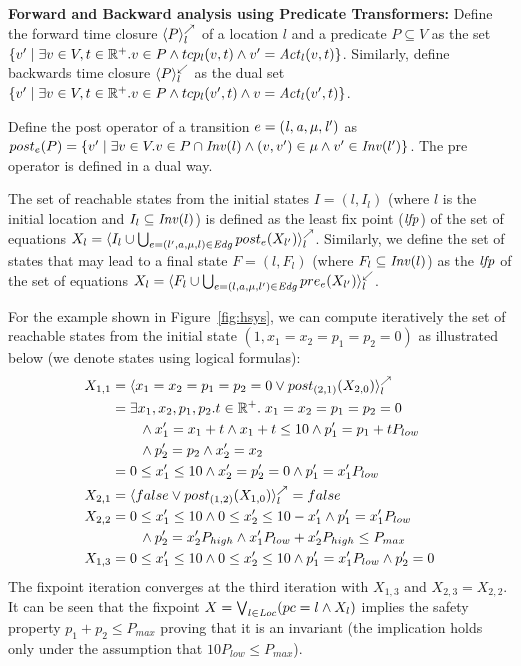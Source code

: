 \textbf{Forward and Backward analysis using Predicate Transformers:}
Define the forward time closure $\langle P \rangle^{\nearrow}_{l}$ of a location $l$ and a predicate $P \subseteq V$ as the set
$\{ v' \; | \; \exists v \in V,t \in \mathbb{R}^+. v \in P \wedge tcp_l(v,t) \wedge v' = \mathit{Act}_l(v,t) \}$.
Similarly, define backwards time closure $\langle P \rangle^{\swarrow}_{l}$ as the dual set 
$\{ v' \; | \; \exists v \in V,t \in \mathbb{R}^+. v \in P \wedge tcp_l(v',t) \wedge v = \mathit{Act}_l(v',t) \}$.

Define the post operator of a transition $e = \mathit{(l,a,\mu,l')}$ as 
$post_e(P) = \{ v' \; | \; \exists v \in V. v \in P \cap \mathit{Inv}(l) \wedge (v,v') \in \mu \wedge v' \in \mathit{Inv}(l') \}$.
The pre operator is defined in a dual way.

The set of reachable states from the initial states $I = (l,I_l)$ (where $l$ is the initial location
and $I_l \subseteq \mathit{Inv}(l)$) 
is defined as the least fix point ($\mathit{lfp}$) of the set of equations 
$X_l = \langle I_l \cup \bigcup_{e=(l',a,\mu,l) \in \mathit{Edg}} post_e(X_{l'}) \rangle^{\nearrow}_{l}$.
Similarly, we define the set of states that may lead to a final state $F = (l,F_l)$ (where $F_l \subseteq \mathit{Inv}(l)$) 
as the $\mathit{lfp}$ of the set of equations $X_l = \langle F_l \cup \bigcup_{e=(l,a,\mu,l') \in \mathit{Edg}} pre_e(X_{l'}) \rangle^{\swarrow}_{l}$.

For the example shown in Figure~\ref{fig:hsys}, we can compute iteratively the set of reachable states from 
the initial state $(1,x_1=x_2=p_1=p_2=0)$ as illustrated below (we denote states using logical formulas):
%
\begin{align*}
X_{1,1} & = \langle x_1=x_2=p_1=p_2=0 \vee post_{(2,1)}(X_{2,0}) \rangle^{\nearrow}_{l} \\
		& = \exists x_1,x_2,p_1,p_2. t \in \mathbb{R}^+. \; x_1=x_2=p_1=p_2=0   \\
		& \qquad \wedge x_1' = x_1 + t \wedge x_1 + t \le 10 \wedge p_1' = p_1 + t P_{low} \\ 
		& \qquad \wedge p_2' = p_2 \wedge x_2' = x_2\\
		& = 0 \le x_1' \le 10 \wedge x_2' = p_2' = 0 \wedge p_1' = x_1' P_{low} \\
X_{2,1} &= \langle false \vee post_{(1,2)}(X_{1,0}) \rangle^{\nearrow}_{l} = false  \\
X_{2,2} & = 0 \le x_1' \le 10 \wedge 0 \le x_2' \le 10 - x_1' \wedge p_1' = x_1'P_{low}  \\
		& \qquad \wedge p_2' = x_2' P_{high} \wedge x_1'P_{low} + x_2'P_{high} \le P_{max} \\
X_{1,3} & = 0 \le x_1' \le 10 \wedge 0 \le x_2' \le 10 \wedge p_1' = x_1'P_{low} \wedge p_2' = 0 
\end{align*}
%
The fixpoint iteration converges at the third iteration with $X_{1,3}$ and $X_{2,3} = X_{2,2}$. 
It can be seen that the fixpoint $X = \bigvee_{l \in \mathit{Loc}} (pc = l \wedge X_l)$ implies the 
safety property $p_1 + p_2 \le P_{max}$ proving that it is an invariant (the implication holds
only under the assumption that $10P_{low} \le P_{max}$).

